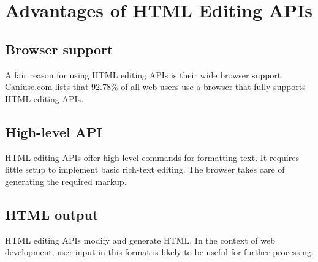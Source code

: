 
\section{Advantages of HTML Editing APIs}
\label{sec:edit_api_adv}


\subsection{Browser support}

A fair reason for using HTML editing APIs is their wide browser support. Caniuse.com lists that 92.78\% of all web users use a browser that fully supports HTML editing APIs\cite{caniuse_contenteditable}.



\subsection{High-level API}

HTML editing APIs offer high-level commands for formatting text. It requires little setup to implement basic rich-text editing. The browser takes care of generating the required markup.

\subsection{HTML output}

HTML editing APIs modify and generate HTML. In the context of web development, user input in this format is likely to be useful for further processing.



